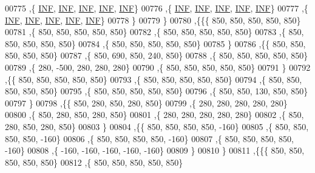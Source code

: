 \begin{DoxyCode}
00775    ,\{   \mbox{\hyperlink{energy__const_8h_a12c2040f25d8e3a7b9e1c2024c618cb6}{INF}},   \mbox{\hyperlink{energy__const_8h_a12c2040f25d8e3a7b9e1c2024c618cb6}{INF}},   \mbox{\hyperlink{energy__const_8h_a12c2040f25d8e3a7b9e1c2024c618cb6}{INF}},   \mbox{\hyperlink{energy__const_8h_a12c2040f25d8e3a7b9e1c2024c618cb6}{INF}},   \mbox{\hyperlink{energy__const_8h_a12c2040f25d8e3a7b9e1c2024c618cb6}{INF}}\}
00776    ,\{   \mbox{\hyperlink{energy__const_8h_a12c2040f25d8e3a7b9e1c2024c618cb6}{INF}},   \mbox{\hyperlink{energy__const_8h_a12c2040f25d8e3a7b9e1c2024c618cb6}{INF}},   \mbox{\hyperlink{energy__const_8h_a12c2040f25d8e3a7b9e1c2024c618cb6}{INF}},   \mbox{\hyperlink{energy__const_8h_a12c2040f25d8e3a7b9e1c2024c618cb6}{INF}},   \mbox{\hyperlink{energy__const_8h_a12c2040f25d8e3a7b9e1c2024c618cb6}{INF}}\}
00777    ,\{   \mbox{\hyperlink{energy__const_8h_a12c2040f25d8e3a7b9e1c2024c618cb6}{INF}},   \mbox{\hyperlink{energy__const_8h_a12c2040f25d8e3a7b9e1c2024c618cb6}{INF}},   \mbox{\hyperlink{energy__const_8h_a12c2040f25d8e3a7b9e1c2024c618cb6}{INF}},   \mbox{\hyperlink{energy__const_8h_a12c2040f25d8e3a7b9e1c2024c618cb6}{INF}},   \mbox{\hyperlink{energy__const_8h_a12c2040f25d8e3a7b9e1c2024c618cb6}{INF}}\}
00778    \}
00779   \}
00780  ,\{\{\{   850,   850,   850,   850,   850\}
00781    ,\{   850,   850,   850,   850,   850\}
00782    ,\{   850,   850,   850,   850,   850\}
00783    ,\{   850,   850,   850,   850,   850\}
00784    ,\{   850,   850,   850,   850,   850\}
00785    \}
00786   ,\{\{   850,   850,   850,   850,   850\}
00787    ,\{   850,   690,   850,   240,   850\}
00788    ,\{   850,   850,   850,   850,   850\}
00789    ,\{   280,  -500,   280,   280,   280\}
00790    ,\{   850,   850,   850,   850,   850\}
00791    \}
00792   ,\{\{   850,   850,   850,   850,   850\}
00793    ,\{   850,   850,   850,   850,   850\}
00794    ,\{   850,   850,   850,   850,   850\}
00795    ,\{   850,   850,   850,   850,   850\}
00796    ,\{   850,   850,   130,   850,   850\}
00797    \}
00798   ,\{\{   850,   280,   850,   280,   850\}
00799    ,\{   280,   280,   280,   280,   280\}
00800    ,\{   850,   280,   850,   280,   850\}
00801    ,\{   280,   280,   280,   280,   280\}
00802    ,\{   850,   280,   850,   280,   850\}
00803    \}
00804   ,\{\{   850,   850,   850,   850,  -160\}
00805    ,\{   850,   850,   850,   850,  -160\}
00806    ,\{   850,   850,   850,   850,  -160\}
00807    ,\{   850,   850,   850,   850,  -160\}
00808    ,\{  -160,  -160,  -160,  -160,  -160\}
00809    \}
00810   \}
00811  ,\{\{\{   850,   850,   850,   850,   850\}
00812    ,\{   850,   850,   850,   850,   850\}

\end{DoxyCode}
